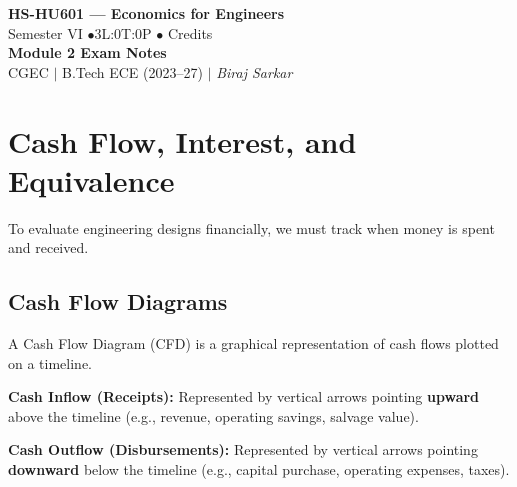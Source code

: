 \documentclass[12pt,a4paper]{article}
\begin{document}

\begin{center}
  {\LARGE\bfseries\color{myred} HS-HU601 --- Economics for Engineers}\\[5pt]
  {\normalsize\color{mydark} Semester VI \quad$\bullet$\quad 3L:0T:0P \quad$\bullet$ Credits}\\[3pt]
  {\normalsize\color{myteal}\textbf{Module 2 Exam Notes}}\\[3pt]
  {\small\color{mydark} CGEC \;$|$\; B.Tech ECE (2023--27) \;$|$\; \textit{Biraj Sarkar}}
\end{center}
\vspace{2pt}
\noindent{\color{myred}\rule{\linewidth}{1.5pt}}
\vspace{2pt}

\hypersetup{linkcolor=mydark}
\tableofcontents
\hypersetup{linkcolor=myteal}
\newpage

\section{Cash Flow, Interest, and Equivalence}

To evaluate engineering designs financially, we must track when money is spent and received.

\subsection{Cash Flow Diagrams}
A Cash Flow Diagram (CFD) is a graphical representation of cash flows plotted on a timeline.

\begin{tcolorbox}[defbox]
\textbf{Cash Inflow (Receipts):} Represented by vertical arrows pointing \textbf{upward} above the timeline (e.g., revenue, operating savings, salvage value).
\par\vspace{3pt}
\textbf{Cash Outflow (Disbursements):} Represented by vertical arrows pointing \textbf{downward} below the timeline (e.g., capital purchase, operating expenses, taxes).
\end{tcolorbox}
\end{document}
